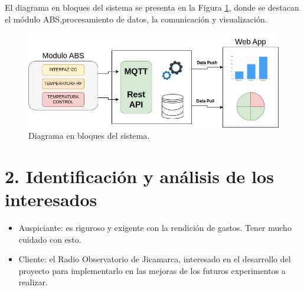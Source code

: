 \documentclass[
11pt, %
]{charter}
\begin{document}
El diagrama en bloques del sistema se presenta en la Figura \ref{fig:diagBloques}, donde se destacan el módulo ABS,procesamiento de datos, la comunicación y visualización.

\begin{figure}[htpb]
	\centering 
	\includegraphics[width=.90\textwidth]{./Figuras/diagBloques.png}
	\caption{Diagrama en bloques del sistema.}
	\label{fig:diagBloques}
\end{figure}

\vspace{25px}


\section{2. Identificación y análisis de los interesados}
\label{sec:interesados}

\begin{itemize}
	\item Auspiciante: es riguroso y exigente con la rendición de gastos. Tener mucho cuidado con esto.
	\item Cliente: el Radio Observatorio de Jicamarca, interesado en el desarrollo del proyecto para implementarlo en las mejoras de los futuros experimentos a realizar.
\end{itemize}
\end{document}
